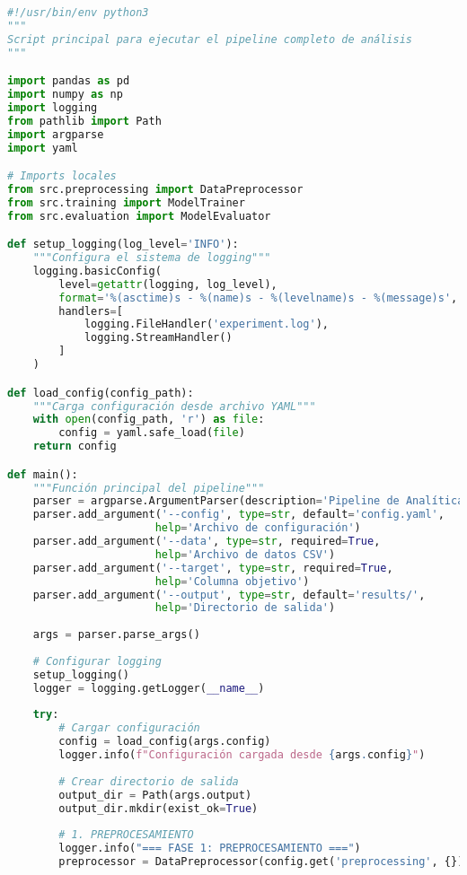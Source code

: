 \begin{lstlisting}[language=Python, caption=Script principal de ejecución]
#!/usr/bin/env python3
"""
Script principal para ejecutar el pipeline completo de análisis
"""

import pandas as pd
import numpy as np
import logging
from pathlib import Path
import argparse
import yaml

# Imports locales
from src.preprocessing import DataPreprocessor
from src.training import ModelTrainer
from src.evaluation import ModelEvaluator

def setup_logging(log_level='INFO'):
    """Configura el sistema de logging"""
    logging.basicConfig(
        level=getattr(logging, log_level),
        format='%(asctime)s - %(name)s - %(levelname)s - %(message)s',
        handlers=[
            logging.FileHandler('experiment.log'),
            logging.StreamHandler()
        ]
    )

def load_config(config_path):
    """Carga configuración desde archivo YAML"""
    with open(config_path, 'r') as file:
        config = yaml.safe_load(file)
    return config

def main():
    """Función principal del pipeline"""
    parser = argparse.ArgumentParser(description='Pipeline de Analítica de Datos')
    parser.add_argument('--config', type=str, default='config.yaml',
                       help='Archivo de configuración')
    parser.add_argument('--data', type=str, required=True,
                       help='Archivo de datos CSV')
    parser.add_argument('--target', type=str, required=True,
                       help='Columna objetivo')
    parser.add_argument('--output', type=str, default='results/',
                       help='Directorio de salida')
    
    args = parser.parse_args()
    
    # Configurar logging
    setup_logging()
    logger = logging.getLogger(__name__)
    
    try:
        # Cargar configuración
        config = load_config(args.config)
        logger.info(f"Configuración cargada desde {args.config}")
        
        # Crear directorio de salida
        output_dir = Path(args.output)
        output_dir.mkdir(exist_ok=True)
        
        # 1. PREPROCESAMIENTO
        logger.info("=== FASE 1: PREPROCESAMIENTO ===")
        preprocessor = DataPreprocessor(config.get('preprocessing', {}))
        

\end{lstlisting}
